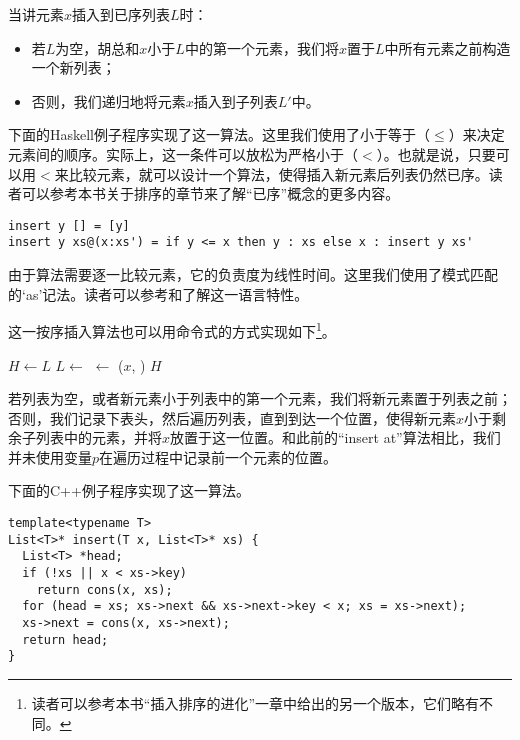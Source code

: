 \documentclass[UTF8]{article}
\begin{document}
当讲元素$x$插入到已序列表$L$时：

\begin{itemize}
\item 若$L$为空，胡总和$x$小于$L$中的第一个元素，我们将$x$置于$L$中所有元素之前构造一个新列表；
\item 否则，我们递归地将元素$x$插入到子列表$L'$中。
\end{itemize}

下面的Haskell例子程序实现了这一算法。这里我们使用了小于等于（$\leq$）来决定元素间的顺序。实际上，这一条件可以放松为严格小于（$<$）。也就是说，只要可以用$<$来比较元素，就可以设计一个算法，使得插入新元素后列表仍然已序。读者可以参考本书关于排序的章节来了解“已序”概念的更多内容。

\lstset{language=Haskell}
\begin{lstlisting}
insert y [] = [y]
insert y xs@(x:xs') = if y <= x then y : xs else x : insert y xs'
\end{lstlisting}

由于算法需要逐一比较元素，它的负责度为线性时间。这里我们使用了模式匹配的‘as’记法。读者可以参考\cite{learn-haskell}和\cite{algo-fp}了解这一语言特性。

这一按序插入算法也可以用命令式的方式实现如下\footnote{读者可以参考本书“插入排序的进化”一章中给出的另一个版本，它们略有不同。}。

\begin{algorithmic}[1]
    \State \Return {}
  \EndIf
  \State $H \gets L$
    \State $L \gets $ 
  \EndWhile
  \State {} $\gets$ ($x$, )
  \State \Return $H$
\EndFunction
\end{algorithmic}

若列表为空，或者新元素小于列表中的第一个元素，我们将新元素置于列表之前；否则，我们记录下表头，然后遍历列表，直到到达一个位置，使得新元素$x$小于剩余子列表中的元素，并将$x$放置于这一位置。和此前的“insert at”算法相比，我们并未使用变量$p$在遍历过程中记录前一个元素的位置。

下面的C++例子程序实现了这一算法。

\lstset{language=C++}
\begin{lstlisting}
template<typename T>
List<T>* insert(T x, List<T>* xs) {
  List<T> *head;
  if (!xs || x < xs->key)
    return cons(x, xs);
  for (head = xs; xs->next && xs->next->key < x; xs = xs->next);
  xs->next = cons(x, xs->next);
  return head;
}
\end{lstlisting}
\end{document}
